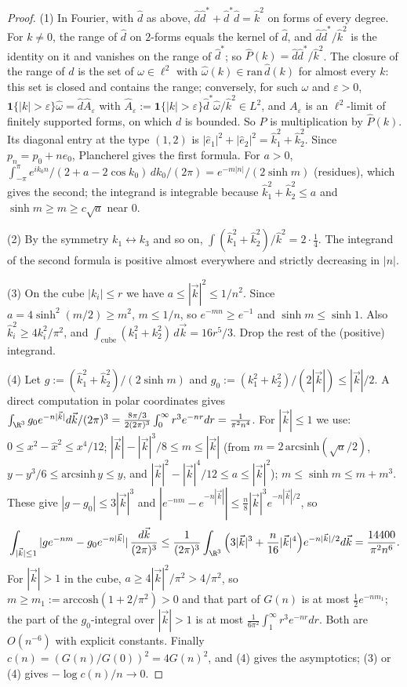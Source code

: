 \begin{proof}
(1) In Fourier, with $\hat d$ as above, $\hat d\hat d^*+\hat d^*\hat d=\hat k^2$ on forms of every degree. For $k\ne0$, the range of $\hat d$ on $2$-forms equals the kernel of $\hat d$, and $\hat d\hat d^*/\hat k^2$ is the identity on it and vanishes on the range of $\hat d^*$; so $\hat P(k)=\hat d\hat d^*/\hat k^2$. The closure of the range of $d$ is the set of $\omega\in\ell^2$ with $\hat\omega(k)\in\mathrm{ran}\,\hat d(k)$ for almost every $k$: this set is closed and contains the range; conversely, for such $\omega$ and $\varepsilon>0$, $\mathbf 1\{|k|>\varepsilon\}\hat\omega=\hat d\hat A_\varepsilon$ with $\hat A_\varepsilon:=\mathbf 1\{|k|>\varepsilon\}\hat d^*\hat\omega/\hat k^2\in L^2$, and $A_\varepsilon$ is an $\ell^2$-limit of finitely supported forms, on which $d$ is bounded. So $P$ is multiplication by $\hat P(k)$. Its diagonal entry at the type $(1,2)$ is $|\hat e_1|^2+|\hat e_2|^2=\hat k_1^2+\hat k_2^2$. Since $p_n=p_0+ne_0$, Plancherel gives the first formula. For $a>0$, $\int_{-\pi}^\pi e^{ik_0n}/(2+a-2\cos k_0)\,dk_0/(2\pi)=e^{-m|n|}/(2\sinh m)$ (residues), which gives the second; the integrand is integrable because $\hat k_1^2+\hat k_2^2\le a$ and $\sinh m\ge m\ge c\sqrt a$ near $0$.

(2) By the symmetry $k_1\leftrightarrow k_3$ and so on, $\int(\hat k_1^2+\hat k_2^2)/\hat k^2=2\cdot\frac14$. The integrand of the second formula is positive almost everywhere and strictly decreasing in $|n|$.

(3) On the cube $|k_i|\le r$ we have $a\le|\vec k|^2\le1/n^2$. Since $a=4\sinh^2(m/2)\ge m^2$, $m\le1/n$, so $e^{-mn}\ge e^{-1}$ and $\sinh m\le\sinh1$. Also $\hat k_i^2\ge4k_i^2/\pi^2$, and $\int_{\text{cube}}(k_1^2+k_2^2)\,d\vec k=16r^5/3$. Drop the rest of the (positive) integrand.

(4) Let $g:=(\hat k_1^2+\hat k_2^2)/(2\sinh m)$ and $g_0:=(k_1^2+k_2^2)/(2|\vec k|)\le|\vec k|/2$. A direct computation in polar coordinates gives $\int_{\R^3}g_0e^{-n|\vec k|}d\vec k/(2\pi)^3=\frac{8\pi/3}{2(2\pi)^3}\int_0^\infty r^3e^{-nr}dr=\frac1{\pi^2n^4}$. For $|\vec k|\le1$ we use: $0\le x^2-\hat x^2\le x^4/12$; $|\vec k|-|\vec k|^3/8\le m\le|\vec k|$ (from $m=2\,\mathrm{arcsinh}(\sqrt a/2)$, $y-y^3/6\le\mathrm{arcsinh}\,y\le y$, and $|\vec k|^2-|\vec k|^4/12\le a\le|\vec k|^2$); $m\le\sinh m\le m+m^3$. These give $|g-g_0|\le3|\vec k|^3$ and $|e^{-nm}-e^{-n|\vec k|}|\le\frac n8|\vec k|^3e^{-n|\vec k|/2}$, so
\[
\int_{|\vec k|\le1}|ge^{-nm}-g_0e^{-n|\vec k|}|\,\frac{d\vec k}{(2\pi)^3}\le\frac1{(2\pi)^3}\int_{\R^3}\Big(3|\vec k|^3+\frac n{16}|\vec k|^4\Big)e^{-n|\vec k|/2}d\vec k=\frac{14400}{\pi^2n^6}.
\]
For $|\vec k|>1$ in the cube, $a\ge4|\vec k|^2/\pi^2>4/\pi^2$, so $m\ge m_1:=\mathrm{arccosh}(1+2/\pi^2)>0$ and that part of $G(n)$ is at most $\tfrac12e^{-nm_1}$; the part of the $g_0$-integral over $|\vec k|>1$ is at most $\frac1{6\pi^2}\int_1^\infty r^3e^{-nr}dr$. Both are $O(n^{-6})$ with explicit constants. Finally $c(n)=(G(n)/G(0))^2=4G(n)^2$, and (4) gives the asymptotics; (3) or (4) gives $-\log c(n)/n\to0$.
\end{proof}


